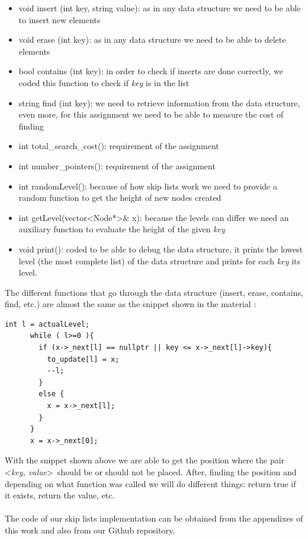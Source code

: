 \documentclass{article}
\begin{document}
\begin{itemize}
    \item void insert (int key, string value): as in any data structure we need to be able to insert new elements 
    \item void erase (int key): as in any data structure we need to be able to delete elements 
    \item bool contains (int key): in order to check if inserts are done correctly, we coded this function to check if \textit{key} is in the list
    \item string find (int key): we need to retrieve information from the data structure, even more, for this assignment we need to be able to measure the cost of finding
    \item int total\_search\_cost(): requirement of the assignment
    \item int number\_pointers(): requirement of the assignment
    \item int randomLevel(): because of how skip lists work we need to provide a random function to get the height of new nodes created
    \item int getLevel(vector\textless Node*\textgreater \& x): because the levels can differ we need an auxiliary function to evaluate the height of the given \textit{key}
    \item void print(): coded to be able to debug the data structure, it prints the lowest level (the most complete list) of the data structure and prints for each \textit{key} its level.
\end{itemize}

The different functions that go through the data structure (insert, erase, contains, find, etc.) are almost the same as the snippet shown in the material \citep{ads:slides}:


\begin{Code}
    \begin{lstlisting}[caption=Snippet to iterate through the skip list, style=myC]
      int l = actualLevel;
      while ( l>=0 ){
        if (x->_next[l] == nullptr || key <= x->_next[l]->key){
          to_update[l] = x;
          --l;
        }
        else {
          x = x->_next[l];
        }
      }
      x = x->_next[0];
    \end{lstlisting}
\end{Code}

With the snippet shown above we are able to get the position where the pair \textless \textit{key, value}\textgreater \ should be or should not be placed. After, finding the position and depending on what function was called we will do different things: return true if it exists, return the value, etc.\\
\\
The code of our skip lists implementation can be obtained from the appendixes of this work and also from our Github repository\citep{github:cristobal}.
\end{document}
